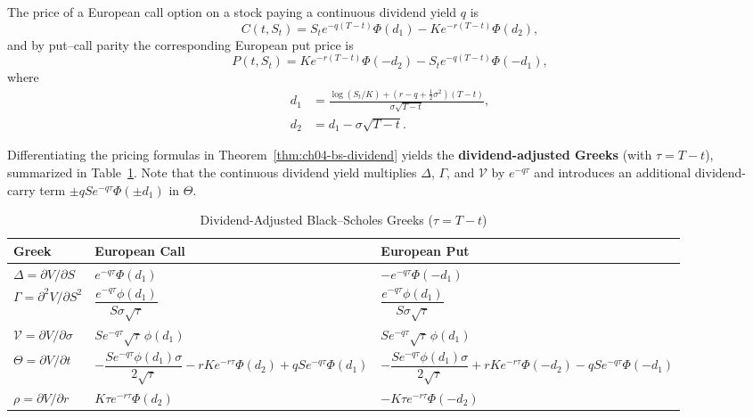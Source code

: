 \begin{theorem}
    \label{thm:ch04-bs-dividend}
    The price of a European call option on a stock paying a continuous dividend yield $q$ is
    \[
        C(t, S_t) = S_t e^{-q(T-t)}\Phi(d_1) - K e^{-r(T-t)}\Phi(d_2),
    \]
    and by put--call parity the corresponding European put price is
    \[
        P(t, S_t) = K e^{-r(T-t)}\Phi(-d_2) - S_t e^{-q(T-t)}\Phi(-d_1),
    \]
    where
    \begin{align*}
        d_1 &= \frac{\log(S_t / K) + \left(r - q + \frac{1}{2}\sigma^2\right)(T - t)}{\sigma\sqrt{T - t}}, \\
        d_2 &= d_1 - \sigma\sqrt{T - t}.
    \end{align*}
\end{theorem}

Differentiating the pricing formulas in Theorem~\ref{thm:ch04-bs-dividend} yields the \textbf{dividend-adjusted Greeks} (with $\tau = T - t$), summarized in Table~\ref{tab:ch04-div-greeks}. Note that the continuous dividend yield multiplies $\Delta$, $\Gamma$, and $\mathcal{V}$ by $e^{-q\tau}$ and introduces an additional dividend-carry term $\pm q S e^{-q\tau}\Phi(\pm d_1)$ in $\Theta$.

\begin{table}[!ht]
    \centering
    \caption{Dividend-Adjusted Black--Scholes Greeks ($\tau = T - t$)}
    \label{tab:ch04-div-greeks}
    \footnotesize
    \setlength{\tabcolsep}{4pt}
    \begin{tabular}{lll}
        \toprule
        \textbf{Greek} & \textbf{European Call} & \textbf{European Put} \\
        \midrule
        $\Delta = \partial V / \partial S$ & $e^{-q\tau}\Phi(d_1)$ & $-e^{-q\tau}\Phi(-d_1)$ \\[4pt]
        $\Gamma = \partial^2 V / \partial S^2$ & $\dfrac{e^{-q\tau}\phi(d_1)}{S\sigma\sqrt{\tau}}$ & $\dfrac{e^{-q\tau}\phi(d_1)}{S\sigma\sqrt{\tau}}$ \\[8pt]
        $\mathcal{V} = \partial V / \partial \sigma$ & $S e^{-q\tau}\sqrt{\tau}\,\phi(d_1)$ & $S e^{-q\tau}\sqrt{\tau}\,\phi(d_1)$ \\[6pt]
        $\Theta = \partial V / \partial t$ & $-\dfrac{S e^{-q\tau}\phi(d_1)\sigma}{2\sqrt{\tau}} - r K e^{-r\tau}\Phi(d_2) + q S e^{-q\tau}\Phi(d_1)$ & $-\dfrac{S e^{-q\tau}\phi(d_1)\sigma}{2\sqrt{\tau}} + r K e^{-r\tau}\Phi(-d_2) - q S e^{-q\tau}\Phi(-d_1)$ \\[8pt]
        $\rho = \partial V / \partial r$ & $K\tau e^{-r\tau}\Phi(d_2)$ & $-K\tau e^{-r\tau}\Phi(-d_2)$ \\
        \bottomrule
    \end{tabular}
\end{table}

